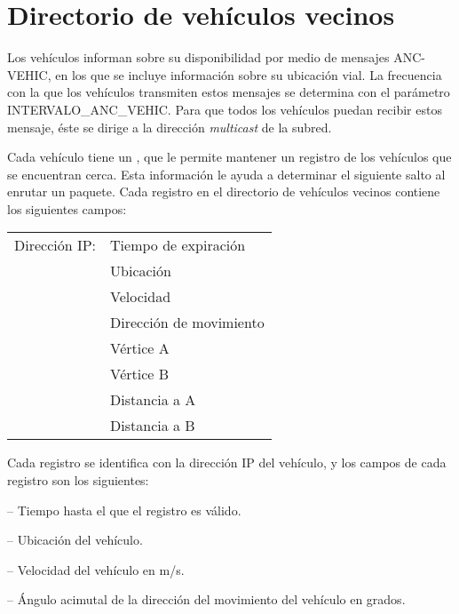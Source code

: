 \section{Directorio de vehículos vecinos}

\label{sec:directiorio_vehiculos_vecinos}

\begin{sloppypar}
Los vehículos informan sobre su disponibilidad por medio de mensajes
\mbox{ANC-VEHIC}, en los que se incluye información sobre su ubicación vial. La
frecuencia con la que los vehículos transmiten estos mensajes se determina con
el parámetro \mbox{INTERVALO\_ANC\_VEHIC}. Para que todos los vehículos puedan
recibir estos mensaje, éste se dirige a la dirección \textit{multicast} de la
subred.
\end{sloppypar}

Cada vehículo tiene un , que le
permite mantener un registro de los vehículos que se encuentran cerca. Esta
información le ayuda a determinar el siguiente salto al enrutar un paquete.
Cada registro en el directorio de vehículos vecinos contiene los siguientes
campos:

\begin{center}
\begin{tabular}{ r l }
Dirección IP: & Tiempo de expiración \\
& Ubicación \\
& Velocidad \\
& Dirección de movimiento \\
& Vértice A \\
& Vértice B \\
& Distancia a A \\
& Distancia a B
\end{tabular}
\end{center}

Cada registro se identifica con la dirección IP del vehículo, y los campos de
cada registro son los siguientes:

 -- Tiempo hasta el que el registro es válido.

 -- Ubicación del vehículo.

 -- Velocidad del vehículo en m/s.

 -- Ángulo acimutal de la dirección del
movimiento del vehículo en grados.

